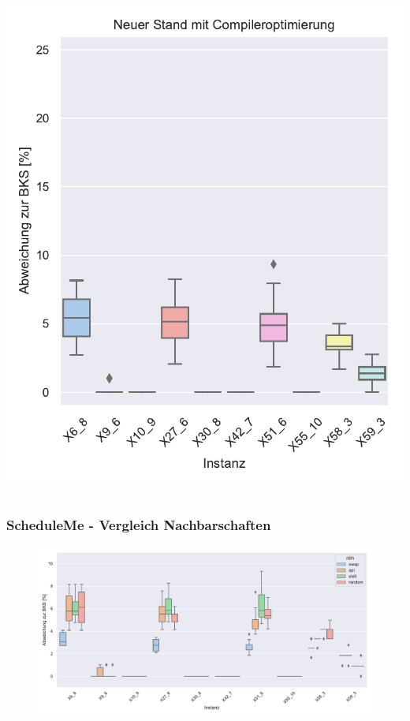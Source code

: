 \documentclass[aspectratio=169]{beamer}
\begin{document}
\begin{frame}
\begin{columns}[c]
			\includegraphics[width=\textwidth]{../images/results_new.pdf}	
	\end{columns}

\end{frame}
	

\begin{frame}
\frametitle{ScheduleMe - Vergleich Nachbarschaften}

	\vspace{-6pt}

	\begin{figure}
		\centering
		\includegraphics[height=0.9\textheight]{../images/results_nbhs.pdf}
	\end{figure}
	
\end{frame}
\end{document}
